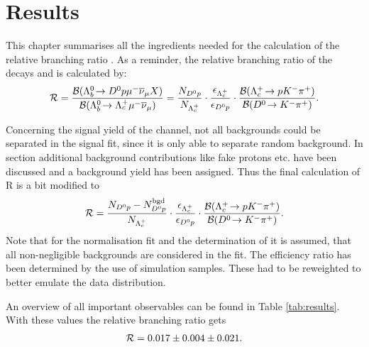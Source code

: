 \chapter{Results}
\label{sec:Results}
This chapter summarises all the ingredients needed for the calculation of the relative branching ratio \R.
As a reminder, the relative branching ratio of the decays \LbToDpmunuX and \LbToLcmunu is calculated by:
\begin{align}
	\mathcal{R} =
	\frac{{\cal B}({{\Lambda}^0_{b}}\!\rightarrow {\ensuremath{{D}^0}}{\ensuremath{p}} {\ensuremath{\mu^-}} {\ensuremath{{\overline{\nu}}_\mu}} X)}{{\cal B}({{\Lambda}^0_{b}}\!\rightarrow {\ensuremath{{\Lambda}^+_{c}}} {\ensuremath{\mu^-}}{\ensuremath{{\overline{\nu}}_\mu}})}
	 = 
	 \frac{N_{{{D}^0}{p}}}{N_{{{\Lambda}^+_{c}}}}  
	 \cdot \frac{\epsilon_{{{\Lambda}^+_{c}}}}{\epsilon_{{{D}^0}{p}}}
	 \cdot \frac{{\cal B}({{\Lambda}^+_{c}}\!\rightarrow p {{K}^-} {{\pi}^+})}{{\cal B}({{D}^0}\!\rightarrow {\ensuremath{{K}^-}}{\ensuremath{{\pi}^+}})}.
\end{align}

Concerning the signal yield \NDp of the \LbToDpmunuX channel, not all backgrounds could be separated in the signal fit, since it is only able to separate random background.
In section  additional background contributions like fake protons etc. have been discussed and a background yield \NBgdDp has been assigned.
Thus the final calculation of R is a bit modified to
\begin{align}
	\mathcal{R} =
	 \frac{N_{{{D}^0}{p}}-N^{\rm bgd}_{{{D}^0}{p}}}{N_{{{\Lambda}^+_{c}}}}  
	 \cdot \frac{\epsilon_{{{\Lambda}^+_{c}}}}{\epsilon_{{{D}^0}{p}}}
	 \cdot \frac{{\cal B}({{\Lambda}^+_{c}}\!\rightarrow p {{K}^-} {{\pi}^+})}{{\cal B}({{D}^0}\!\rightarrow {\ensuremath{{K}^-}}{\ensuremath{{\pi}^+}})}. \label{eq:R_mod}
\end{align}
Note that for the normalisation fit and the determination of \NLc it is assumed, that all non-negligible backgrounds are considered in the fit.
The efficiency ratio \effRatio has been determined by the use of simulation samples.
These had to be reweighted to better emulate the data distribution.


An overview of all important observables can be found in Table \ref{tab:results}.
With these values the relative branching ratio \R gets
\begin{align*}
    \mathcal{R} = 0.017 \pm 0.004 \pm 0.021.
\end{align*}
